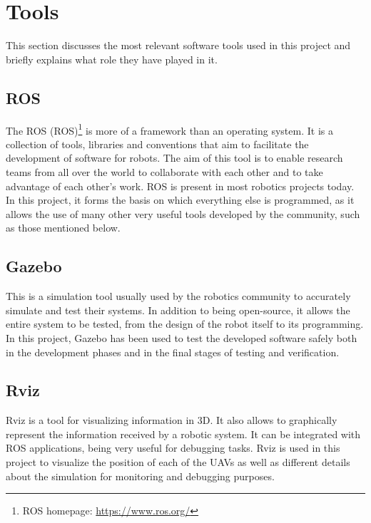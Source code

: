 \section{Tools}
\label{sec:Tools}
This section discusses the most relevant software tools used in this project and briefly explains what role they have played in it.

\subsection{ROS}
\label{subsec:ROS}
The \acrlong{ROS} (\acrshort{ROS})\footnote{ROS homepage: \url{https://www.ros.org/}} is more of a framework than an operating system. It is a collection of tools, libraries and conventions that aim to facilitate the development of software for robots. The aim of this tool is to enable research teams from all over the world to collaborate with each other and to take advantage of each other's work. \gls{ROS} is present in most robotics projects today. In this project, it forms the basis on which everything else is programmed, as it allows the use of many other very useful tools developed by the community, such as those mentioned below.

\subsection{Gazebo}
\label{subsec:Gazebo}
This is a simulation tool usually used by the robotics community to accurately simulate and test their systems. In addition to being open-source, it allows the entire system to be tested, from the design of the robot itself to its programming. In this project, Gazebo has been used to test the developed software safely both in the development phases and in the final stages of testing and verification.

\subsection{Rviz}
\label{subsec:Rviz}
Rviz is a tool for visualizing information in 3D. It also allows to graphically represent the information received by a robotic system. It can be integrated with ROS applications, being very useful for debugging tasks. Rviz is used in this project to visualize the position of each of the UAVs as well as different details about the simulation for monitoring and debugging purposes.

